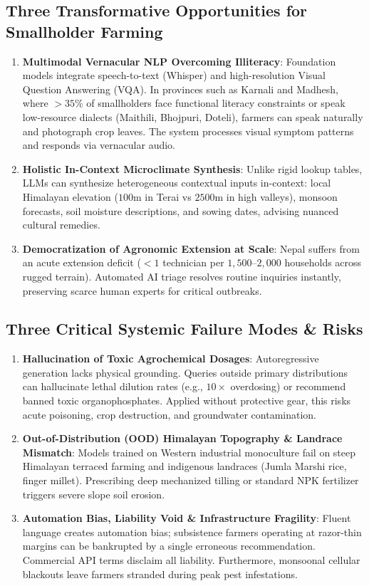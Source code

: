 \documentclass[11pt,a4paper]{article}
\theoremstyle{definition}
\theoremstyle{plain}
\theoremstyle{remark}
\begin{document}
\subsection{Three Transformative Opportunities for Smallholder Farming}
\begin{enumerate}
    \item \textbf{Multimodal Vernacular NLP Overcoming Illiteracy}: Foundation models integrate speech-to-text (Whisper) and high-resolution Visual Question Answering (VQA). In provinces such as Karnali and Madhesh, where $>35\%$ of smallholders face functional literacy constraints or speak low-resource dialects (Maithili, Bhojpuri, Doteli), farmers can speak naturally and photograph crop leaves. The system processes visual symptom patterns and responds via vernacular audio.
    \item \textbf{Holistic In-Context Microclimate Synthesis}: Unlike rigid lookup tables, LLMs can synthesize heterogeneous contextual inputs in-context: local Himalayan elevation ($100\text{m}$ in Terai vs $2500\text{m}$ in high valleys), monsoon forecasts, soil moisture descriptions, and sowing dates, advising nuanced cultural remedies.
    \item \textbf{Democratization of Agronomic Extension at Scale}: Nepal suffers from an acute extension deficit ($<1$ technician per $1{,}500\text{--}2{,}000$ households across rugged terrain). Automated AI triage resolves routine inquiries instantly, preserving scarce human experts for critical outbreaks.
\end{enumerate}

\subsection{Three Critical Systemic Failure Modes \& Risks}
\begin{enumerate}
    \item \textbf{Hallucination of Toxic Agrochemical Dosages}: Autoregressive generation lacks physical grounding. Queries outside primary distributions can hallucinate lethal dilution rates (e.g., $10\times$ overdosing) or recommend banned toxic organophosphates. Applied without protective gear, this risks acute poisoning, crop destruction, and groundwater contamination.
    \item \textbf{Out-of-Distribution (OOD) Himalayan Topography \& Landrace Mismatch}: Models trained on Western industrial monoculture fail on steep Himalayan terraced farming and indigenous landraces (Jumla Marshi rice, finger millet). Prescribing deep mechanized tilling or standard NPK fertilizer triggers severe slope soil erosion.
    \item \textbf{Automation Bias, Liability Void \& Infrastructure Fragility}: Fluent language creates automation bias; subsistence farmers operating at razor-thin margins can be bankrupted by a single erroneous recommendation. Commercial API terms disclaim all liability. Furthermore, monsoonal cellular blackouts leave farmers stranded during peak pest infestations.
\end{enumerate}
\end{document}
